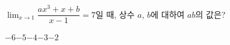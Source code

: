 $\displaystyle\lim_{x\to 1}\dfrac{ax^3+x+b}{x-1}=7$일 때, 상수 $a$, $b$에 대하여 $ab$의 값은?
\begin{choices32}{$-6$}{$-5$}{$-4$}{$-3$}{$-2$}\end{choices32}
